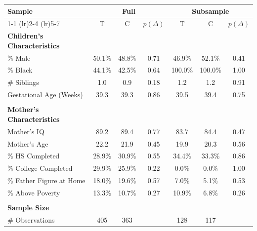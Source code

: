 \begin{tabular}{lcccccc}
\toprule 
\midrule 
Sample & \multicolumn{3}{c}{Full} & \multicolumn{3}{c}{Subsample} \\
 \cmidrule(lr){1-1} \cmidrule(lr){2-4} \cmidrule(lr){5-7} 
 & T & C & $p(\Delta)$ & T & C & $p(\Delta)$ \\
\midrule 
\textbf{Children's Characteristics} \\
\quad \% Male & 50.1\% & 48.8\% & 0.71 & 46.9\% & 52.1\% & 0.41 \\
\quad \% Black & 44.1\% & 42.5\% & 0.64 & 100.0\% & 100.0\% & 1.00 \\
\quad \# Siblings & 1.0 & 0.9 & 0.18 & 1.2 & 1.2 & 0.91 \\
\quad Gestational Age (Weeks) & 39.3 & 39.3 & 0.86 & 39.5 & 39.4 & 0.75 \\
 \\
\textbf{Mother's Characteristics} \\
\quad Mother's IQ & 89.2 & 89.4 & 0.77 & 83.7 & 84.4 & 0.47 \\
\quad Mother's Age & 22.2 & 21.9 & 0.45 & 19.9 & 20.3 & 0.56 \\
\quad \% HS Completed & 28.9\% & 30.9\% & 0.55 & 34.4\% & 33.3\% & 0.86 \\
\quad \% College Completed & 29.9\% & 25.9\% & 0.22 & 0.0\% & 0.0\% & 1.00 \\
\quad \% Father Figure at Home & 18.0\% & 19.6\% & 0.57 & 7.0\% & 5.1\% & 0.53 \\
\quad \% Above Poverty & 13.3\% & 10.7\% & 0.27 & 10.9\% & 6.8\% & 0.26 \\
 \\
\textbf{Sample Size} \\
\quad \# Observations & 405 & 363 &  & 128 & 117 &  \\
\midrule 
\bottomrule 
\end{tabular}
